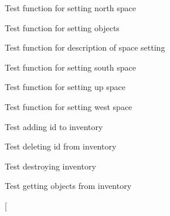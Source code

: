 \begin{DoxyRefList}
\item[\label{test__test000148}%
\hypertarget{test__test000148}{}%
Global \hyperlink{space__test_8c_a3d3457a89f705948102cf1e5d4a7b45b}{test1\+\_\+space\+\_\+set\+\_\+north} ()]Test function for setting north space  
\item[\label{test__test000145}%
\hypertarget{test__test000145}{}%
Global \hyperlink{space__test_8c_a208ae9352ff979024f6ebef4e791356a}{test1\+\_\+space\+\_\+set\+\_\+object} ()]Test function for setting objects  
\item[\label{test__test000135}%
\hypertarget{test__test000135}{}%
Global \hyperlink{space__test_8c_a36f278e9a36d1af63082a6aeb968a094}{test1\+\_\+space\+\_\+set\+\_\+short\+\_\+description} ()]Test function for description of space setting  
\item[\label{test__test000153}%
\hypertarget{test__test000153}{}%
Global \hyperlink{space__test_8c_a21938e16547b3080e9251f960117a859}{test1\+\_\+space\+\_\+set\+\_\+south} ()]Test function for setting south space  
\item[\label{test__test000172}%
\hypertarget{test__test000172}{}%
Global \hyperlink{space__test_8c_a087e9efe152864bbb919b3d4208f66b7}{test1\+\_\+space\+\_\+set\+\_\+up} ()]Test function for setting up space  
\item[\label{test__test000163}%
\hypertarget{test__test000163}{}%
Global \hyperlink{space__test_8c_ab680a8797f793dffd58546074b87d21f}{test1\+\_\+space\+\_\+set\+\_\+west} ()]Test function for setting west space  
\item[\label{test__test000003}%
\hypertarget{test__test000003}{}%
Global \hyperlink{inventory__test_8c_abfb3407529398f76999549e42d567a7e}{test2\+\_\+inventory\+\_\+add\+\_\+id} ()]Test adding id to inventory  
\item[\label{test__test000010}%
\hypertarget{test__test000010}{}%
Global \hyperlink{inventory__test_8c_a23c8b0ed664f86b5fdafbfbd875ee27d}{test2\+\_\+inventory\+\_\+delete\+\_\+id} ()]Test deleting id from inventory  
\item[\label{test__test000013}%
\hypertarget{test__test000013}{}%
Global \hyperlink{inventory__test_8c_a9f3daec28c696c0671e6a3e905359741}{test2\+\_\+inventory\+\_\+destroy} ()]Test destroying inventory  
\item[\label{test__test000021}%
\hypertarget{test__test000021}{}%
Global \hyperlink{inventory__test_8c_a6a440546c4b5335db5bb0e93688bf847}{test2\+\_\+inventory\+\_\+get\+\_\+object} ()]Test getting objects from inventory  
\item[\label{test__test000008}%

\end{DoxyRefList}
